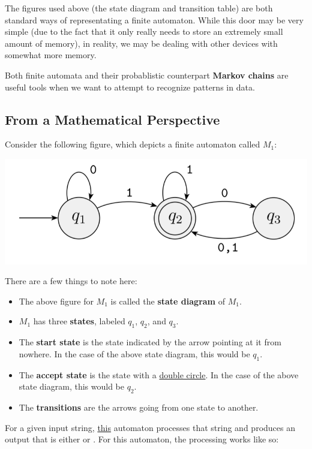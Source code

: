 \documentclass[letterpaper]{article}
\begin{document}
\bigskip

The figures used above (the state diagram and transition table) are both standard ways of representating a finite automaton. While this door may be very simple (due to the fact that it only really needs to store an extremely small amount of memory), in reality, we may be dealing with other devices with somewhat more memory. 

\bigskip

Both finite automata and their probablistic counterpart \textbf{Markov chains} are useful tools when we want to attempt to recognize patterns in data. 

\subsection{From a Mathematical Perspective}
Consider the following figure, which depicts a finite automaton called $M_1$:
\begin{center}
    \includegraphics[scale=0.4]{../assets/finite_automaton_1.png}
\end{center}
There are a few things to note here: 
\begin{itemize}
    \item The above figure for $M_1$ is called the \textbf{state diagram} of $M_1$. 
    \item $M_1$ has three \textbf{states}, labeled $q_1$, $q_2$, and $q_3$. 
    \item The \textbf{start state} is the state indicated by the arrow pointing at it from nowhere. In the case of the above state diagram, this would be $q_1$. 
    \item The \textbf{accept state} is the state with a \underline{double circle}. In the case of the above state diagram, this would be $q_2$. 
    \item The \textbf{transitions} are the arrows going from one state to another. 
\end{itemize}
For a given input string, \underline{this} automaton processes that string and produces an output that is either  or . For this automaton, the processing works like so: 
\end{document}
